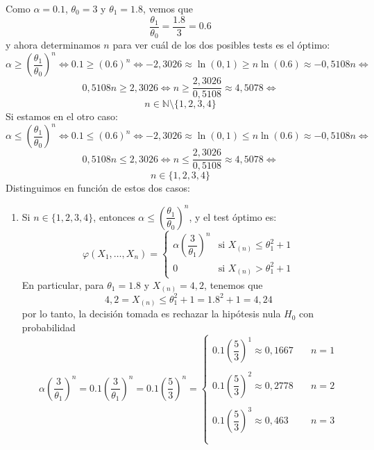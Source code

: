 \documentclass[12pt]{article}
\newcommand{\N}{\mathbb{N}}
\begin{document}
\begin{ejercicio}
\begin{enumerate}[label=\alph*)]
            Como $\alpha = 0.1$, $\theta_0 = 3$ y $\theta_1 = 1.8$, vemos que 
            $$\dfrac{\theta_1}{\theta_0} = \dfrac{1.8}{3} = 0.6$$
            y ahora determinamos $n$ para ver cuál de los dos posibles tests es el óptimo:
            $$\alpha \geq \left( \dfrac{\theta_1}{\theta_0} \right)^{n} \iff 
            0.1 \geq \left( 0.6 \right)^{n} \iff -2,3026 \approx \ln(0,1) \geq n \ln(0.6) \approx -0,5108 n \iff$$
            $$0,5108 n \geq 2,3026 \iff n \geq \dfrac{2,3026}{0,5108} \approx 4,5078 \iff$$
            $$n \in \N \setminus \{1,2,3,4\}$$
            Si estamos en el otro caso:
            $$\alpha \leq \left( \dfrac{\theta_1}{\theta_0} \right)^{n} \iff 
            0.1 \leq \left( 0.6 \right)^{n} \iff -2,3026 \approx \ln(0,1) \leq n \ln(0.6) \approx -0,5108 n \iff$$
            $$0,5108 n \leq 2,3026 \iff n \leq \dfrac{2,3026}{0,5108} \approx 4,5078 \iff$$
            $$n \in \{1,2,3,4\}$$ 
            Distinguimos en función de estos dos casos:
            \begin{enumerate}
                \item Si $n \in \{1,2,3,4\}$, entonces $\alpha \leq \left( \dfrac{\theta_1}{\theta_0} \right)^{n}$, y el
                test óptimo es:
                $$\varphi(X_1, \ldots, X_n) = 
                \begin{cases}
                    \alpha \left( \dfrac{3}{\theta_1} \right)^{n} &\text{si } X_{(n)} \leq \theta_1^2 + 1 \\
                    0 &\text{si } X_{(n)} > \theta_1^2 + 1
                \end{cases}$$
                En particular, para $\theta_1 = 1.8$ y $X_{(n)} = 4,2$, tenemos que 
                $$4,2 = X_{(n)} \leq \theta_1^2 + 1 = 1.8^2 + 1 = 4,24$$
                por lo tanto, la decisión tomada es rechazar la hipótesis nula $H_0$ con probabilidad 
                $$\alpha \left( \dfrac{3}{\theta_1} \right)^{n} = 
                0.1 \left( \dfrac{3}{\theta_1} \right)^{n} = 0.1 \left( \dfrac{5}{3} \right)^n = \begin{cases}
                    0.1 \left( \dfrac{5}{3} \right)^1 \approx 0,1667 &\quad n=1 \\\\
                    0.1 \left( \dfrac{5}{3} \right)^2 \approx 0,2778 &\quad n=2 \\\\
                    0.1 \left( \dfrac{5}{3} \right)^3 \approx 0,463  &\quad n=3 \\\\

\end{cases}$$
\end{enumerate}
\end{enumerate}
\end{ejercicio}
\end{document}
